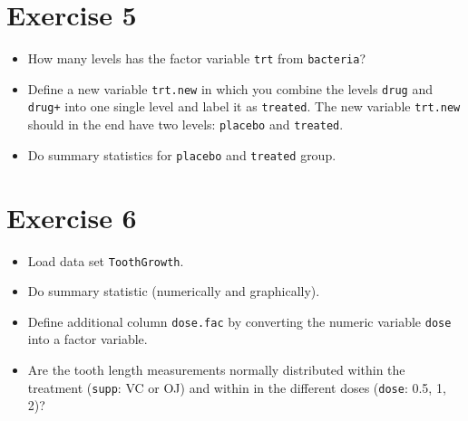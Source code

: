 \documentclass[11pt]{article}\usepackage[]{graphicx}\usepackage[]{color}
\begin{document}
%
\section*{Exercise 5}
\begin{itemize}
\item How many levels has the factor variable \texttt{trt} from \texttt{bacteria}?

\item Define a new variable \texttt{trt.new} in which you combine the levels
\texttt{drug} and \texttt{drug+} into one single level and label it as \texttt{treated}.
The new variable \texttt{trt.new} should in the end have two levels: \texttt{placebo} and \texttt{treated}.

\item Do summary statistics for \texttt{placebo} and \texttt{treated} group.

\end{itemize}
%
\section*{Exercise 6}
\begin{itemize}
\item Load data set \texttt{ToothGrowth}.

\item Do summary statistic (numerically and graphically).

\item Define additional column \texttt{dose.fac} by converting the numeric variable \texttt{dose} into a factor variable.

%
\item Are the tooth length measurements normally distributed within the treatment
(\texttt{supp}: VC or OJ) and within in the different doses (\texttt{dose}: 0.5, 1, 2)?

\end{itemize}
%
\end{document}
